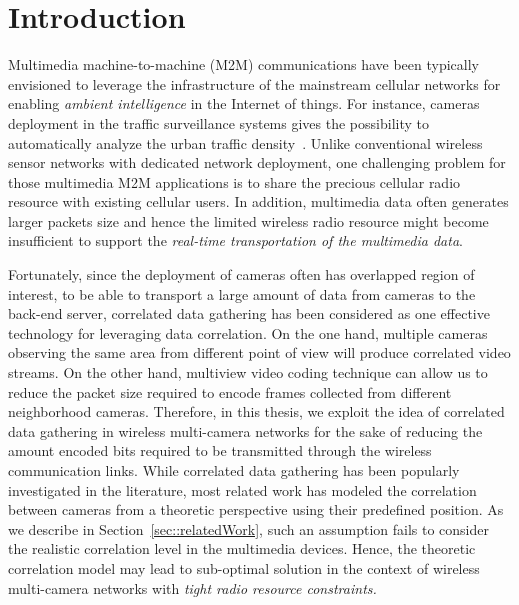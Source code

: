 \section{Introduction}
\label{sec::introduction}
Multimedia machine-to-machine (M2M) communications have been typically envisioned to leverage the infrastructure of the mainstream cellular networks for enabling {\em ambient intelligence} in the Internet of things.
For instance, cameras deployment in the traffic surveillance systems gives the possibility to automatically analyze the urban traffic density~\cite{Kapsch,Traficon,Citilog}.
%
Unlike conventional wireless sensor networks with dedicated network deployment, one challenging problem for those multimedia M2M applications is to share the precious cellular radio resource with existing cellular users.
%
In addition, multimedia data often generates larger packets size and hence the limited wireless radio resource might become insufficient to support the {\em real-time transportation of the multimedia data}.

Fortunately, since the deployment of cameras often has overlapped region of interest, to be able to transport a large amount of data from cameras to the back-end server, correlated data gathering has been considered as one effective technology for leveraging data correlation.
On the one hand, multiple cameras observing the same area from different point of view will produce correlated video streams. 
On the other hand, multiview video coding technique can allow us to reduce the packet size required to encode frames collected from different neighborhood cameras.
Therefore, in this thesis, we exploit the idea of correlated data gathering in wireless multi-camera networks for the sake of reducing the amount encoded bits required to be transmitted through the wireless communication links.
%
While correlated data gathering has been popularly investigated in the literature, most related work has modeled the correlation between cameras from a theoretic perspective using their predefined position.
As we describe in Section~\ref{sec::relatedWork}, such an assumption fails to consider the realistic correlation level in the multimedia devices.
Hence, the theoretic correlation model may lead to sub-optimal solution in the context of wireless multi-camera networks with {\em tight radio resource constraints.}

